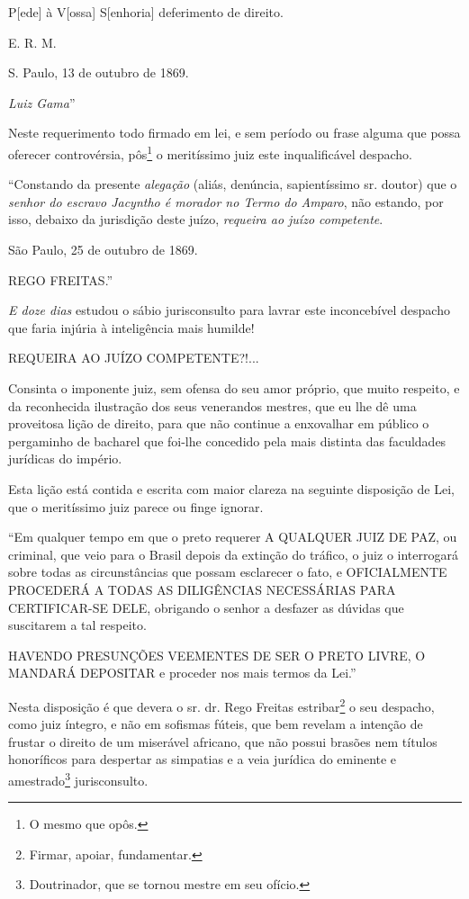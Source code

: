 P{[}ede{]} à V{[}ossa{]} S{[}enhoria{]} deferimento de direito.

E. R. M.

S. Paulo, 13 de outubro de 1869.

\emph{Luiz Gama}''

Neste requerimento todo firmado em lei, e sem período ou frase alguma
que possa oferecer controvérsia, pôs\footnote{O mesmo que opôs.} o
meritíssimo juiz este inqualificável despacho.

``Constando da presente \emph{alegação} (aliás, denúncia, sapientíssimo
sr. doutor) que o \emph{senhor do escravo Jacyntho é morador no Termo do
Amparo}, não estando, por isso, debaixo da jurisdição deste juízo,
\emph{requeira ao juízo competente}.

São Paulo, 25 de outubro de 1869.

REGO FREITAS.''

\emph{E doze dias} estudou o sábio jurisconsulto para lavrar este
inconcebível despacho que faria injúria à inteligência mais humilde!

REQUEIRA AO JUÍZO COMPETENTE?!...

Consinta o imponente juiz, sem ofensa do seu amor próprio, que muito
respeito, e da reconhecida ilustração dos seus venerandos mestres, que
eu lhe dê uma proveitosa lição de direito, para que não continue a
enxovalhar em público o pergaminho de bacharel que foi-lhe concedido
pela mais distinta das faculdades jurídicas do império.

Esta lição está contida e escrita com maior clareza na seguinte
disposição de Lei, que o meritíssimo juiz parece ou finge ignorar.

``Em qualquer tempo em que o preto requerer A QUALQUER JUIZ DE PAZ, ou
criminal, que veio para o Brasil depois da extinção do tráfico, o juiz o
interrogará sobre todas as circunstâncias que possam esclarecer o fato,
e OFICIALMENTE PROCEDERÁ A TODAS AS DILIGÊNCIAS NECESSÁRIAS PARA
CERTIFICAR-SE DELE, obrigando o senhor a desfazer as dúvidas que
suscitarem a tal respeito.

HAVENDO PRESUNÇÕES VEEMENTES DE SER O PRETO LIVRE, O MANDARÁ DEPOSITAR e
proceder nos mais termos da Lei.''

Nesta disposição é que devera o sr. dr. Rego Freitas estribar\footnote{
  Firmar, apoiar, fundamentar.} o seu despacho, como juiz íntegro, e não
em sofismas fúteis, que bem revelam a intenção de frustar o direito de
um miserável africano, que não possui brasões nem títulos honoríficos
para despertar as simpatias e a veia jurídica do eminente e
amestrado\footnote{Doutrinador, que se tornou mestre em seu ofício.}
jurisconsulto.

